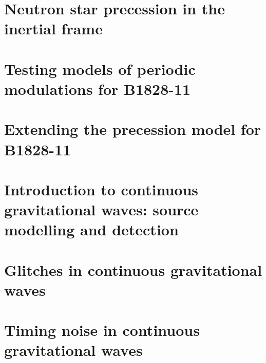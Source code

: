 \documentclass[twoside]{thesis}
\begin{document}
\chapter{Neutron star precession in the inertial frame}
\label{sec: inertial frame}


\chapter{Testing models of periodic modulations for B1828-11}
\label{sec: testing models}


\chapter{Extending the precession model for B1828-11}
\label{sec: extending precession models}

\chapter{Introduction to continuous gravitational waves: source modelling and detection}
\label{sec: intro to cgw}

\chapter{Glitches in continuous gravitational waves}
\label{sec: glitches in cgw}

\chapter{Timing noise in continuous gravitational waves}
\label{sec: timing noise in cgw}





\end{document}
